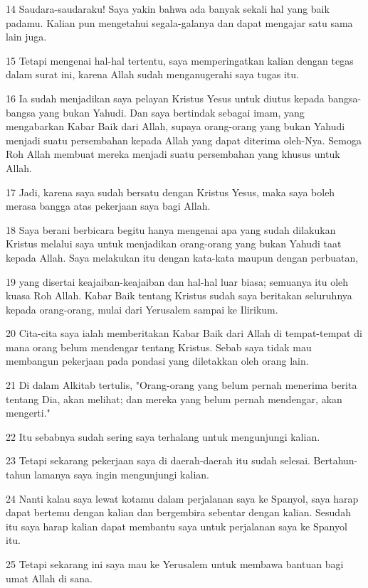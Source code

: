 \par 14 Saudara-saudaraku! Saya yakin bahwa ada banyak sekali hal yang baik padamu. Kalian pun mengetahui segala-galanya dan dapat mengajar satu sama lain juga.
\par 15 Tetapi mengenai hal-hal tertentu, saya memperingatkan kalian dengan tegas dalam surat ini, karena Allah sudah menganugerahi saya tugas itu.
\par 16 Ia sudah menjadikan saya pelayan Kristus Yesus untuk diutus kepada bangsa-bangsa yang bukan Yahudi. Dan saya bertindak sebagai imam, yang mengabarkan Kabar Baik dari Allah, supaya orang-orang yang bukan Yahudi menjadi suatu persembahan kepada Allah yang dapat diterima oleh-Nya. Semoga Roh Allah membuat mereka menjadi suatu persembahan yang khusus untuk Allah.
\par 17 Jadi, karena saya sudah bersatu dengan Kristus Yesus, maka saya boleh merasa bangga atas pekerjaan saya bagi Allah.
\par 18 Saya berani berbicara begitu hanya mengenai apa yang sudah dilakukan Kristus melalui saya untuk menjadikan orang-orang yang bukan Yahudi taat kepada Allah. Saya melakukan itu dengan kata-kata maupun dengan perbuatan,
\par 19 yang disertai keajaiban-keajaiban dan hal-hal luar biasa; semuanya itu oleh kuasa Roh Allah. Kabar Baik tentang Kristus sudah saya beritakan seluruhnya kepada orang-orang, mulai dari Yerusalem sampai ke Ilirikum.
\par 20 Cita-cita saya ialah memberitakan Kabar Baik dari Allah di tempat-tempat di mana orang belum mendengar tentang Kristus. Sebab saya tidak mau membangun pekerjaan pada pondasi yang diletakkan oleh orang lain.
\par 21 Di dalam Alkitab tertulis, "Orang-orang yang belum pernah menerima berita tentang Dia, akan melihat; dan mereka yang belum pernah mendengar, akan mengerti."
\par 22 Itu sebabnya sudah sering saya terhalang untuk mengunjungi kalian.
\par 23 Tetapi sekarang pekerjaan saya di daerah-daerah itu sudah selesai. Bertahun-tahun lamanya saya ingin mengunjungi kalian.
\par 24 Nanti kalau saya lewat kotamu dalam perjalanan saya ke Spanyol, saya harap dapat bertemu dengan kalian dan bergembira sebentar dengan kalian. Sesudah itu saya harap kalian dapat membantu saya untuk perjalanan saya ke Spanyol itu.
\par 25 Tetapi sekarang ini saya mau ke Yerusalem untuk membawa bantuan bagi umat Allah di sana.
